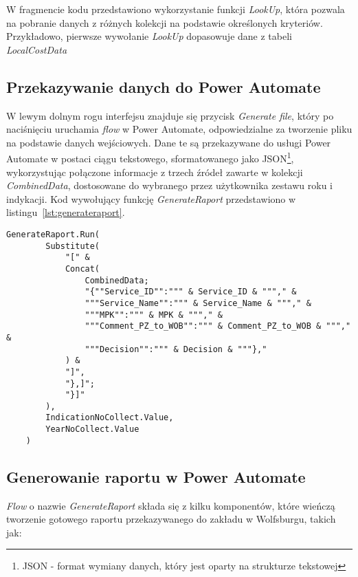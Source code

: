 W fragmencie kodu przedstawiono wykorzystanie funkcji \textit{LookUp}, która pozwala na pobranie danych z różnych kolekcji na podstawie określonych kryteriów. Przykładowo, pierwsze wywołanie \textit{LookUp} dopasowuje dane z tabeli \textit{LocalCostData}

\subsection{Przekazywanie danych do Power Automate}

W lewym dolnym rogu interfejsu znajduje się przycisk \textit{Generate file}, który po naciśnięciu uruchamia \textit{flow} w Power Automate, odpowiedzialne za tworzenie pliku na podstawie danych wejściowych. Dane te są przekazywane do usługi Power Automate w postaci ciągu tekstowego, sformatowanego jako JSON\footnote{JSON - format wymiany danych, który jest oparty na strukturze tekstowej}, wykorzystując połączone informacje z trzech źródeł zawarte w kolekcji \textit{CombinedData}, dostosowane do wybranego przez użytkownika zestawu roku i indykacji. Kod wywołujący funkcję \textit{GenerateRaport} przedstawiono w listingu~\ref{lst:generateraport}.



\begin{lstlisting}[language=PowerFx, caption={Kod wywołujący funkcję GenerateRaport}, label={lst:generateraport}]
    GenerateRaport.Run(
        Substitute(
            "[" & 
            Concat(
                CombinedData;
                "{""Service_ID"":""" & Service_ID & """," &
                """Service_Name"":""" & Service_Name & """," &
                """MPK"":""" & MPK & """," &
                """Comment_PZ_to_WOB"":""" & Comment_PZ_to_WOB & """," &
                """Decision"":""" & Decision & """},"
            ) & 
            "]",
            "},]"; 
            "}]"
        ),
        IndicationNoCollect.Value,
        YearNoCollect.Value
    )
    \end{lstlisting}



\subsection{Generowanie raportu w Power Automate}


\emph{Flow} o nazwie \emph{GenerateRaport} składa się z kilku komponentów, które wieńczą tworzenie gotowego raportu przekazywanego do zakładu w Wolfsburgu, takich jak:

